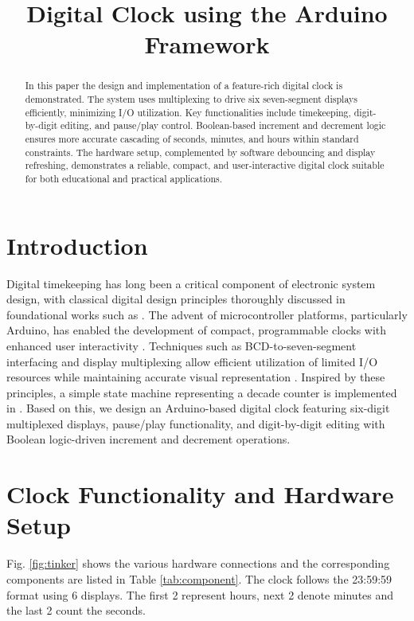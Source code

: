\documentclass[conference]{IEEEtran}
\title{Digital Clock using the Arduino Framework}
\author{
    \IEEEauthorblockN{Dhawal Saini and G. V. V. Sharma}
    \IEEEauthorblockA{Department of Electrical Engineering\\
    Indian Institute of Technology Hyderabad\\
    Email: gadepall@ee.iith.ac.in}
}
\begin{document}
\maketitle

\begin{abstract}
In this paper the design and implementation of a feature-rich digital clock is demonstrated. The system uses multiplexing to drive six seven-segment displays efficiently, minimizing I/O utilization. Key functionalities include timekeeping, digit-by-digit editing, and pause/play control. Boolean-based increment and decrement logic ensures more accurate cascading of seconds, minutes, and hours within standard constraints. The hardware setup, complemented by software debouncing and display refreshing, demonstrates a reliable, compact, and user-interactive digital clock suitable for both educational and practical applications.
\end{abstract}
\section{Introduction}
Digital timekeeping has long been a critical component of electronic system design, with classical digital design principles thoroughly discussed in foundational works such as \cite{mano2013digital, malvino2017digital, patterson2014computer}. The advent of microcontroller platforms, particularly Arduino, has enabled the development of compact, programmable clocks with enhanced user interactivity \cite{arduino_reference}. Techniques such as BCD-to-seven-segment interfacing and display multiplexing allow efficient utilization of limited I/O resources while maintaining accurate visual representation \cite{ti7447datasheet}. Inspired by these principles, a simple state machine representing a decade counter is  implemented in \cite{ddta}.  Based 
on this, 
we design an Arduino-based digital clock featuring six-digit multiplexed displays, pause/play functionality, and digit-by-digit editing with Boolean logic-driven increment and decrement operations.

%
%
\section{Clock Functionality and Hardware Setup}
Fig. \ref{fig:tinker}  shows the various hardware connections and the corresponding components are listed in 
Table \ref{tab:component}.  The clock follows the 23:59:59 format using 6 displays.  The first 2 represent hours, next 2 denote minutes and the last 2 count the seconds.
\end{document}
